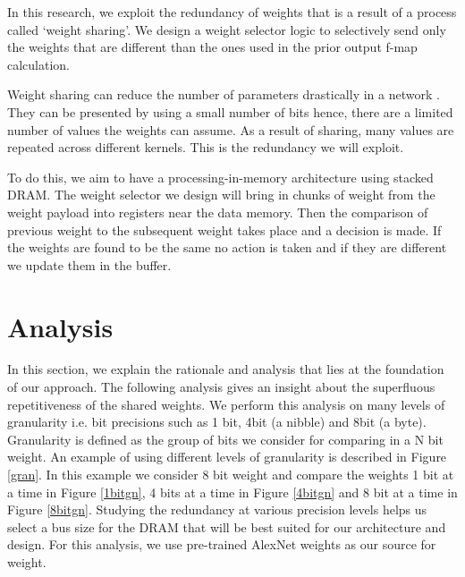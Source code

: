 \documentclass[conference]{IEEEtran}
\begin{document}
In this research, we exploit the redundancy of weights that is a result of a process called `weight sharing'\cite{han2015deep}. We design a weight selector logic to selectively send only the weights that are different than the ones used in the prior output f-map calculation. 

Weight sharing can reduce the number of parameters drastically in a network \cite{han2016eie}. They can be presented by using a small number of bits hence, there are a limited number of values the weights can assume. As a result of sharing, many values are repeated across different kernels. This is the redundancy we will exploit.

To do this, we aim to have a processing-in-memory architecture  using stacked DRAM. The weight selector we design will bring in chunks of weight from the weight payload into registers near the data memory. Then the comparison of previous weight to the subsequent weight takes place and a decision is made. If the weights are found to be the same no action is taken and if they are different we update them in the buffer. 

%



\section{Analysis}

In this section, we explain the rationale and analysis that lies at the foundation of our approach. The following analysis gives an insight about the superfluous repetitiveness of the shared weights. We perform this analysis on many levels of granularity i.e. bit precisions such as 1 bit, 4bit (a nibble) and 8bit (a byte). \color{red} Granularity is defined as the group of bits we consider for comparing in a N bit weight. An example of using different levels of granularity is described in Figure \ref{gran}. In this example we consider 8 bit weight and compare the weights 1 bit at a time in Figure \ref{1bitgn}, 4 bits at a time in Figure \ref{4bitgn} and 8 bit at a time in Figure \ref{8bitgn}. \color{black} Studying the redundancy at various precision levels helps us select a bus size for the DRAM that will be best suited for our architecture and design. For this analysis, we use pre-trained AlexNet weights as our source for weight\cite{alexnet_matlab}.
\end{document}
